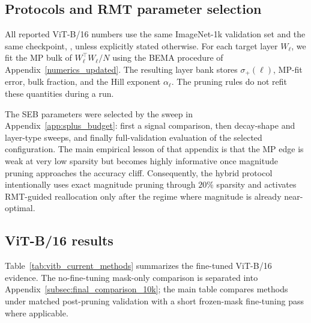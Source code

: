 \documentclass[11pt]{article}
\theoremstyle{plain}
\theoremstyle{definition}
\theoremstyle{remark}
\newcommand{\1}{\mathbf{1}}
\begin{document}
\subsection{Protocols and RMT parameter selection}
\label{pruning_strategy}

All reported ViT-B/16 numbers use the same ImageNet-1k validation set \cite{5206848} and the same checkpoint, , unless explicitly stated otherwise.  For each target layer \(W_\ell\), we fit the MP bulk of \(W_\ell^\top W_\ell/N\) using the BEMA procedure of Appendix~\ref{numerics_updated}.  The resulting layer bank stores \(\sigma_+(\ell)\), MP-fit error, bulk fraction, and the Hill exponent \(\alpha_\ell\).  The pruning rules do not refit these quantities during a run.

The SEB parameters were selected by the sweep in Appendix~\ref{app:splus_budget}: first a signal comparison, then decay-shape and layer-type sweeps, and finally full-validation evaluation of the selected configuration.  The main empirical lesson of that appendix is that the MP edge is weak at very low sparsity but becomes highly informative once magnitude pruning approaches the accuracy cliff.  Consequently, the hybrid protocol intentionally uses exact magnitude pruning through \(20\%\) sparsity and activates RMT-guided reallocation only after the regime where magnitude is already near-optimal.

\subsection{ViT-B/16 results}
\label{subsec:vitb_current_results}

Table~\ref{tab:vitb_current_methods} summarizes the fine-tuned ViT-B/16 evidence.  The no-fine-tuning mask-only comparison is separated into Appendix~\ref{subsec:final_comparison_10k}; the main table compares methods under matched post-pruning validation with a short frozen-mask fine-tuning pass where applicable.
\end{document}
